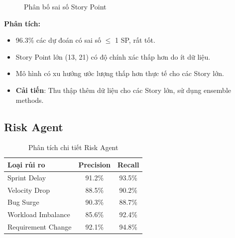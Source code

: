 \documentclass[12pt,a4paper]{report}
\begin{document}
\begin{figure}[H]
\centering
{}
\caption{Phân bố sai số Story Point}
\label{fig:sp_error_distribution}
\end{figure}

\textbf{Phân tích:}
\begin{itemize}
\item 96.3\% các dự đoán có sai số $\le$ 1 SP, rất tốt.
\item Story Point lớn (13, 21) có độ chính xác thấp hơn do ít dữ liệu.
\item Mô hình có xu hướng ước lượng thấp hơn thực tế cho các Story lớn.
\item \textbf{Cải tiến}: Thu thập thêm dữ liệu cho các Story lớn, sử dụng ensemble methods.
\end{itemize}

\subsection{Risk Agent}

\begin{table}[H]
\centering
\caption{Phân tích chi tiết Risk Agent}
\begin{tabular}{|p{5cm}|c|c|}
\hline
\textbf{Loại rủi ro} & \textbf{Precision} & \textbf{Recall} \\
\hline
Sprint Delay & 91.2\% & 93.5\% \\
\hline
Velocity Drop & 88.5\% & 90.2\% \\
\hline
Bug Surge & 90.3\% & 88.7\% \\
\hline
Workload Imbalance & 85.6\% & 92.4\% \\
\hline
Requirement Change & 92.1\% & 94.8\% \\
\hline
\end{tabular}
\label{tab:risk_detailed}
\end{table}
\end{document}
